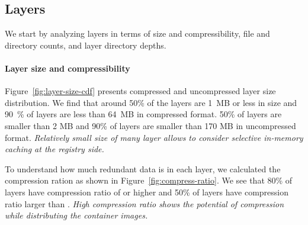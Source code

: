 \subsection{Layers}
\label{sec:layers}

We start by analyzing layers in terms of size and compressibility, file and
directory counts, and layer directory depths.

\paragraph{Layer size and compressibility}



Figure~\ref{fig:layer-size-cdf} presents compressed and uncompressed layer size
distribution.
%
%
We find that around 50\% of the layers are 1~MB or less in size and 90~\% of
layers are less than 64~MB in compressed format.
%
%
50\% of layers are smaller than 2 MB and 90\% of layers are smaller than 170 MB
in uncompressed format.
%
%
\emph{Relatively small size of many layer allows to consider selective
in-memory caching at the registry side.}

To understand how much redundant data is in each layer, we calculated the
compression ration as shown in Figure~\ref{fig:compress-ratio}.
%
We see that 80\% of layers have compression ratio of  or higher
and 50\% of layers have compression ratio larger than .
%
\emph{High compression ratio shows the potential of compression while
distributing the container images.}

%
%
%
%

